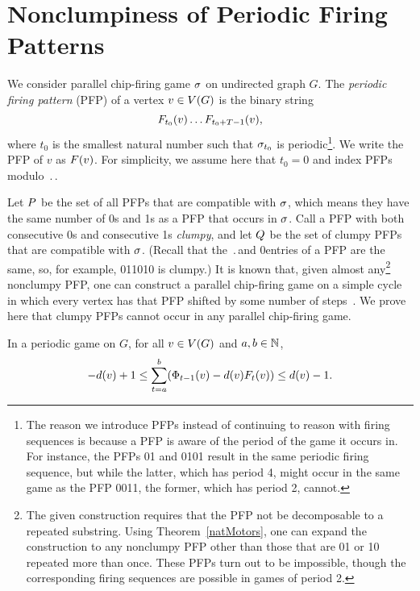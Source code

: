 \section{Nonclumpiness of Periodic Firing Patterns}\label{nonclumpiness}
We consider parallel chip-firing game $\sigma$ on undirected graph $G$. The
\emph{periodic firing pattern} (PFP) of a vertex $v \in V(G)$ is the binary
string
\[
  \firing{v}{t_0}\dots\firing{v}{t_0 + \period - 1},
\]
where $t_0$ is the smallest natural number such that $\sigma_{t_0}$ is
periodic\footnote{The reason we introduce PFPs instead of continuing to reason
  with firing sequences is because a PFP is aware of the period of the game it
  occurs in. For instance, the PFPs 01 and 0101 result in the same periodic
  firing sequence, but while the latter, which has period 4, might occur in the
  same game as the PFP 0011, the former, which has period 2, cannot.}. We write
the PFP of $v$ as $\pfp{v}$. For simplicity, we assume here that $t_0 = 0$ and
index PFPs modulo $\period$.

Let $\pfps$ be the set of all PFPs that are compatible with $\sigma$, which means
they have the same number of 0s and 1s as a PFP that occurs in $\sigma$. Call a PFP
with both consecutive 0s and consecutive 1s \emph{clumpy}, and let $\cpfps$ be
the set of clumpy PFPs that are compatible with $\sigma$. (Recall that the
$\period$\xth and 0\xth entries of a PFP are the same, so, for example, 011010
is clumpy.) It is known that, given almost any\footnote{The given construction
  requires that the PFP not be decomposable to a repeated substring. Using
  Theorem~\ref{natMotors}, one can expand the construction to any nonclumpy PFP
  other than those that are 01 or 10 repeated more than once. These PFPs turn
  out to be impossible, though the corresponding firing sequences are possible
  in games of period 2.}  nonclumpy PFP, one can construct a parallel
chip-firing game on a simple cycle in which every vertex has that PFP shifted
by some number of steps~\cite{cycle}. We prove here that clumpy PFPs cannot
occur in any parallel chip-firing game.

\begin{lem}\label{strongbg}
In a periodic game on $G$, for all $v \in V(G)$ and $a, b \in \mathbb{N}$,
\begin{equation}\label{local}
  -\deg{v} + 1 \leq \sum_{t=a}^{b}(\receiving{v}{t-1} - \deg{v}\firing{v}{t})
  \leq \deg{v}-1.
\end{equation}
\end{lem}

